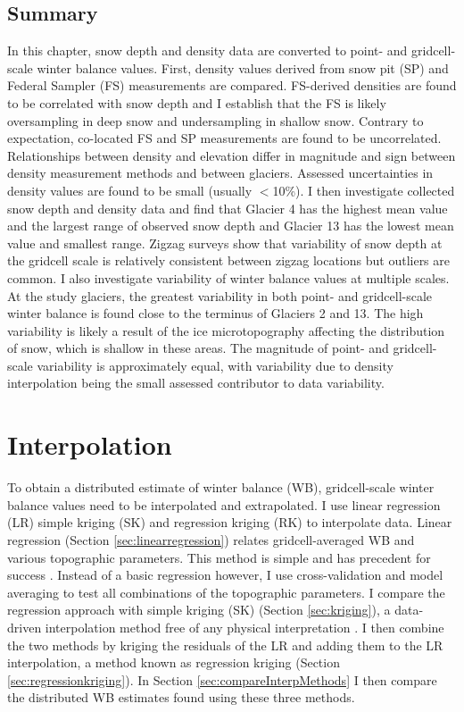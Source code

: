\documentclass{sfuthesis}
\begin{document}
\section{Summary}

In this chapter, snow depth and density data are converted to point- and gridcell-scale winter balance values. First, density values derived from snow pit (SP) and Federal Sampler (FS) measurements are compared. FS-derived densities are found to be correlated with snow depth and I establish that the FS is likely oversampling in deep snow and undersampling in shallow snow. Contrary to expectation, co-located FS and SP measurements are found to be  uncorrelated. Relationships between density and elevation differ in magnitude and sign between density measurement methods and between glaciers. Assessed uncertainties in density values are found to be small (usually $<$10\%). I then investigate collected snow depth and density data and find that Glacier 4 has the highest mean value and the largest range of observed snow depth and Glacier 13 has the lowest mean value and smallest range. Zigzag surveys show that variability of snow depth at the gridcell scale is relatively consistent between zigzag locations but outliers are common. I also investigate variability of winter balance values at multiple scales. At the study glaciers, the greatest variability in both point- and gridcell-scale winter balance is found close to the terminus of Glaciers 2 and 13. The high variability is likely a result of the ice microtopography affecting the distribution of snow, which is shallow in these areas. The magnitude of point- and gridcell-scale variability is approximately equal, with variability due to density interpolation being the small assessed contributor to data variability.


\chapter{Interpolation}

To obtain a distributed estimate of winter balance (WB), gridcell-scale winter balance values need to be interpolated and extrapolated. I use linear regression (LR) simple kriging (SK) and regression kriging (RK) to interpolate data. Linear regression (Section \ref{sec:linearregression}) relates gridcell-averaged WB and various topographic parameters. This method is simple and has precedent for success \citep[e.g.][]{McGrath2015}. Instead of a basic regression however, I use cross-validation and model averaging to test all combinations of the topographic parameters. I compare the regression approach with simple kriging (SK) (Section \ref{sec:kriging}), a data-driven interpolation method free of any physical interpretation \citep[e.g.][]{Hock1999}. I then combine the two methods by kriging the residuals of the LR and adding them to the LR interpolation, a method known as regression kriging (Section \ref{sec:regressionkriging}). In Section \ref{sec:compareInterpMethods} I then compare the distributed WB estimates found using these three methods.
\end{document}
